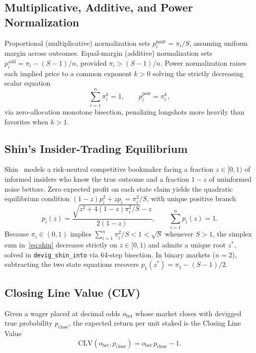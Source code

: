 \documentclass{article}
\begin{document}
\subsection{Multiplicative, Additive, and Power Normalization}
Proportional (multiplicative) normalization sets $p_i^{\text{mult}} = \pi_i / S$, assuming uniform margin across outcomes. Equal-margin (additive) normalization sets $p_i^{\text{add}} = \pi_i - (S - 1)/n$, provided $\pi_i > (S - 1)/n$. Power normalization raises each implied price to a common exponent $k > 0$ solving the strictly decreasing scalar equation
\begin{equation}
\sum_{i=1}^{n} \pi_i^{k} = 1, \qquad p_i^{\text{pow}} = \pi_i^{k},
\end{equation}
via zero-allocation monotone bisection, penalizing longshots more heavily than favorites when $k > 1$.

\subsection{Shin's Insider-Trading Equilibrium}
Shin~\cite{shin1993measuring} models a risk-neutral competitive bookmaker facing a fraction $z \in [0, 1)$ of informed insiders who know the true outcome and a fraction $1 - z$ of uninformed noise bettors. Zero expected profit on each state claim yields the quadratic equilibrium condition $(1 - z) p_i^2 + z p_i = \pi_i^2 / S$, with unique positive branch
\begin{equation}
p_i(z) = \frac{\sqrt{z^2 + 4(1 - z)\pi_i^2 / S} - z}{2(1 - z)}, \qquad \sum_{i=1}^{n} p_i(z) = 1.
\label{eq:shin}
\end{equation}
Because $\pi_i \in (0, 1)$ implies $\sum_{i=1}^n \pi_i^2 / S < 1 < \sqrt{S}$ whenever $S > 1$, the simplex sum in~\eqref{eq:shin} decreases strictly on $z \in [0, 1)$ and admits a unique root $z^*$, solved in \texttt{devig\_shin\_into} via 64-step bisection. In binary markets ($n = 2$), subtracting the two state equations recovers $p_1(z^*) = \pi_1 - (S - 1)/2$.

\subsection{Closing Line Value (CLV)}
Given a wager placed at decimal odds $o_{\text{bet}}$ whose market closes with devigged true probability $p_{\text{close}}$, the expected return per unit staked is the Closing Line Value
\begin{equation}
\mathrm{CLV}(o_{\text{bet}}, p_{\text{close}}) = o_{\text{bet}}\,p_{\text{close}} - 1.
\end{equation}
\end{document}
